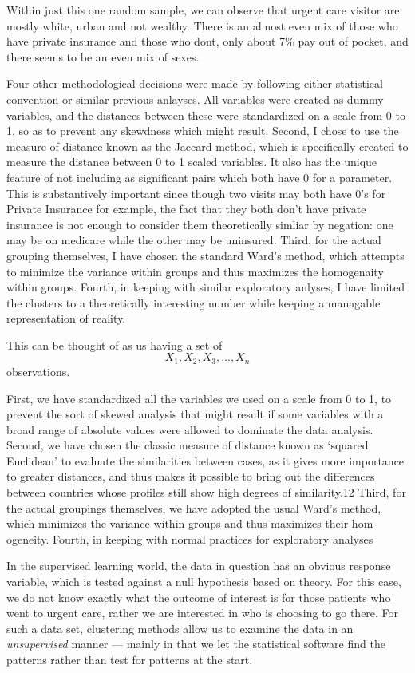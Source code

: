 \documentclass[12pt,twoside]{reedthesis}
\begin{document}
  Within just this one random sample, we can observe that urgent care
  visitor are mostly white, urban and not wealthy. There is an almost even
  mix of those who have private insurance and those who dont, only about
  7\% pay out of pocket, and there seems to be an even mix of sexes.
  
  Four other methodological decisions were made by following either
  statistical convention or similar previous anlayses. All variables were
  created as dummy variables, and the distances between these were
  standardized on a scale from 0 to 1, so as to prevent any skewdness
  which might result. Second, I chose to use the measure of distance known
  as the Jaccard method, which is specifically created to measure the
  distance between 0 to 1 scaled variables. It also has the unique feature
  of not including as significant pairs which both have 0 for a parameter.
  This is substantively important since though two visits may both have
  0's for Private Insurance for example, the fact that they both don't
  have private insurance is not enough to consider them theoretically
  simliar by negation: one may be on medicare while the other may be
  uninsured. Third, for the actual grouping themselves, I have chosen the
  standard Ward's method, which attempts to minimize the variance within
  groups and thus maximizes the homogenaity within groups. Fourth, in
  keeping with similar exploratory anlyses, I have limited the clusters to
  a theoretically interesting number while keeping a managable
  representation of reality.
  
  This can be thought of as us having a set of
  \[X_{1}, X_{2}, X_{3}, ..., X_{n}\] observations.
  
  First, we have standardized all the variables we used on a scale from 0
  to 1, to prevent the sort of skewed analysis that might result if some
  variables with a broad range of absolute values were allowed to dominate
  the data analysis. Second, we have chosen the classic measure of
  distance known as `squared Euclidean' to evaluate the similarities
  between cases, as it gives more importance to greater distances, and
  thus makes it possible to bring out the differences between countries
  whose profiles still show high degrees of similarity.12 Third, for the
  actual groupings themselves, we have adopted the usual Ward's method,
  which minimizes the variance within groups and thus maximizes their hom-
  ogeneity. Fourth, in keeping with normal practices for exploratory
  analyses
  
  In the supervised learning world, the data in question has an obvious
  response variable, which is tested against a null hypothesis based on
  theory. For this case, we do not know exactly what the outcome of
  interest is for those patients who went to urgent care, rather we are
  interested in who is choosing to go there. For such a data set,
  clustering methods allow us to examine the data in an
  \emph{unsupervised} manner --- mainly in that we let the statistical
  software find the patterns rather than test for patterns at the start.
  
\end{document}

